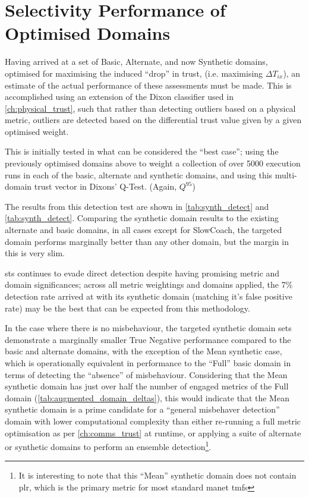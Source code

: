 \section{Selectivity Performance of Optimised Domains}\label{sec:selectivity-performance-of-optimised-domains}

Having arrived at a set of Basic, Alternate, and now Synthetic domains, optimised for maximising the induced ``drop'' in trust, (i.e. maximising $\Delta T_{ix}$), an estimate of the actual performance of these assessments must be made.
This is accomplished using an extension of the Dixon classifier used in \autoref{ch:physical_trust}, such that rather than detecting outliers based on a physical metric, outliers are detected based on the differential trust value given by a given optimised weight.

This is initially tested in what can be considered the ``best case''; using the previously optimised domains above to weight a collection of over 5000 execution runs in each of the basic, alternate and synthetic domains, and using this multi-domain trust vector in Dixons' Q-Test. (Again, $Q^{95}$)

The results from this detection test are shown in \autoref{tab:synth_detect} and \autoref{tab:synth_detect}.
Comparing the synthetic domain results to the existing alternate and basic domains, in all cases except for SlowCoach, the targeted domain performs marginally better than any other domain, but the margin in this is very slim.

\gls{sts} continues to evade direct detection despite having promising metric and domain significances; across all metric weightings and domains applied, the 7\% detection rate arrived at with its synthetic domain (matching it's false positive rate) may be the best that can be expected from this methodology.

In the case where there is no misbehaviour, the targeted synthetic domain sets demonstrate a marginally smaller True Negative performance compared to the basic and alternate domains, with the exception of the Mean synthetic case, which is operationally equivalent in performance to the ``Full'' basic domain in terms of detecting the ``absence'' of misbehaviour. 
Considering that the Mean synthetic domain has just over half the number of engaged metrics of the Full domain (\autoref{tab:augmented_domain_deltas}), this would indicate that the Mean synthetic domain is a prime candidate for a ``general misbehaver detection'' domain with lower computational complexity than either re-running a full metric optimisation as per \autoref{ch:comms_trust} at runtime, or applying a suite of alternate or synthetic domains to perform an ensemble detection\footnote{It is interesting to note that this ``Mean'' synthetic domain does not contain \gls{plr}, which is the primary metric for most standard \gls{manet} \glspl{tmf}}.

